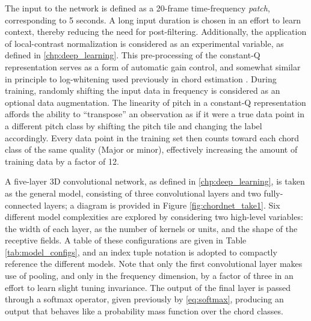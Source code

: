 The input to the network is defined as a 20-frame time-frequency \emph{patch}, corresponding to 5 seconds.
A long input duration is chosen in an effort to learn context, thereby reducing the need for post-filtering.
Additionally, the application of local-contrast normalization is considered as an experimental variable, as defined in \ref{chp:deep_learning}.
This pre-processing of the constant-Q representation serves as a form of automatic gain control, and somewhat similar in principle to log-whitening used previously in chord estimation \cite{Cho2011}.
During training, randomly shifting the input data in frequency is considered as an optional data augmentation.
The linearity of pitch in a constant-Q representation affords the ability to ``transpose'' an observation as if it were a true data point in a different pitch class by shifting the pitch tile and changing the label accordingly.
Every data point in the training set then counts toward each chord class of the same quality (Major or minor), effectively increasing the amount of training data by a factor of 12.

A five-layer 3D convolutional network, as defined in \ref{chp:deep_learning}, is taken as the general model, consisting of three convolutional layers and two fully-connected layers; a diagram is provided in Figure \ref{fig:chordnet_take1}.
Six different model complexities are explored by considering two high-level variables: the width of each layer, as the number of kernels or units, and the shape of the receptive fields.
A table of these configurations are given in Table \ref{tab:model_configs}, and an index tuple notation is adopted to compactly reference the different models.
Note that only the first convolutional layer makes use of pooling, and only in the frequency dimension, by a factor of three in an effort to learn slight tuning invariance.
The output of the final layer is passed through a softmax operator, given previously by \ref{eq:softmax}, producing an output that behaves like a probability mass function over the chord classes.


